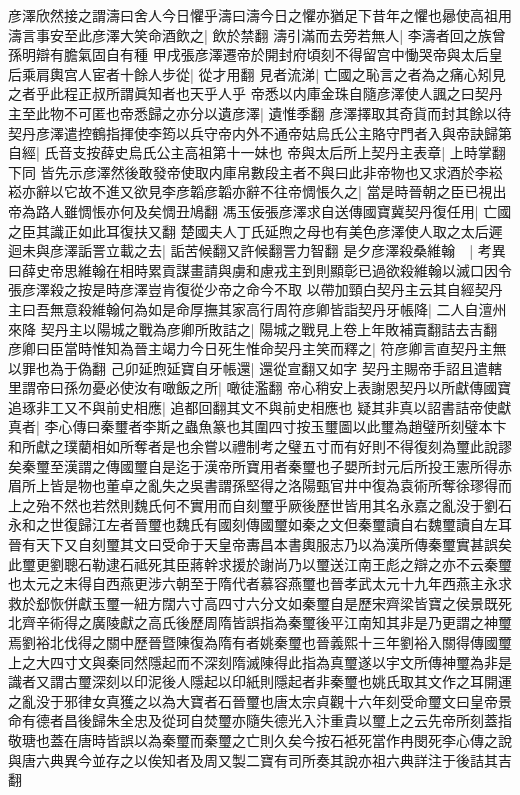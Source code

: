 彦澤欣然接之謂濤曰舍人今日懼乎濤曰濤今日之懼亦猶足下昔年之懼也曏使高祖用濤言事安至此彦澤大笑命酒飲之|{
	飲於禁翻}
濤引滿而去旁若無人|{
	李濤者回之族曾孫明辯有膽氣固自有種}
甲戌張彦澤遷帝於開封府頃刻不得留宫中慟哭帝與太后皇后乘肩輿宫人宦者十餘人步從|{
	從才用翻}
見者流涕|{
	亡國之恥言之者為之痛心矧見之者乎此程正叔所謂眞知者也天乎人乎}
帝悉以内庫金珠自隨彦澤使人諷之曰契丹主至此物不可匿也帝悉歸之亦分以遺彦澤|{
	遺惟季翻}
彦澤擇取其奇貨而封其餘以待契丹彦澤遣控鶴指揮使李筠以兵守帝内外不通帝姑烏氏公主賂守門者入與帝訣歸第自經|{
	氏音支按薛史烏氏公主高祖第十一妹也}
帝與太后所上契丹主表章|{
	上時掌翻下同}
皆先示彦澤然後敢發帝使取内庫帛數段主者不與曰此非帝物也又求酒於李崧崧亦辭以它故不進又欲見李彦韜彦韜亦辭不往帝惆悵久之|{
	當是時晉朝之臣已視出帝為路人雖惆悵亦何及矣惆丑鳩翻}
馮玉佞張彦澤求自送傳國寶冀契丹復任用|{
	亡國之臣其識正如此耳復扶又翻}
楚國夫人丁氏延煦之母也有美色彦澤使人取之太后遲迴未與彦澤詬詈立載之去|{
	詬苦候翻又許候翻詈力智翻}
是夕彦澤殺桑維翰　|{
	考異曰薛史帝思維翰在相時累貢謀畫請與虜和慮戎主到則顯彰已過欲殺維翰以滅口因令張彦澤殺之按是時彦澤豈肯復從少帝之命今不取}
以帶加頸白契丹主云其自經契丹主曰吾無意殺維翰何為如是命厚撫其家高行周符彦卿皆詣契丹牙帳降|{
	二人自澶州來降}
契丹主以陽城之戰為彦卿所敗詰之|{
	陽城之戰見上卷上年敗補賣翻詰去吉翻}
彦卿曰臣當時惟知為晉主竭力今日死生惟命契丹主笑而釋之|{
	符彦卿言直契丹主無以罪也為于偽翻}
己卯延煦延寶自牙帳還|{
	還從宣翻又如字}
契丹主賜帝手詔且遣轄里謂帝曰孫勿憂必使汝有噉飯之所|{
	噉徒濫翻}
帝心稍安上表謝恩契丹以所獻傳國寶追琢非工又不與前史相應|{
	追都回翻其文不與前史相應也}
疑其非真以詔書詰帝使獻真者|{
	李心傳曰秦璽者李斯之蟲魚篆也其圍四寸按玉璽圖以此璽為趙璧所刻璧本卞和所獻之璞藺相如所奪者是也余嘗以禮制考之璧五寸而有好則不得復刻為璽此說謬矣秦璽至漢謂之傳國璽自是迄于漢帝所寶用者秦璽也子嬰所封元后所投王憲所得赤眉所上皆是物也董卓之亂失之吳書謂孫堅得之洛陽甄官井中復為袁術所奪徐璆得而上之殆不然也若然則魏氏何不實用而自刻璽乎厥後歷世皆用其名永嘉之亂没于劉石永和之世復歸江左者晉璽也魏氏有國刻傳國璽如秦之文但秦璽讀自右魏璽讀自左耳晉有天下又自刻璽其文曰受命于天皇帝夀昌本書輿服志乃以為漢所傳秦璽實甚誤矣此璽更劉聰石勒逮石祗死其臣蔣幹求援於謝尚乃以璽送江南王彪之辯之亦不云秦璽也太元之末得自西燕更涉六朝至于隋代者慕容燕璽也晉孝武太元十九年西燕主永求救於郄恢併獻玉璽一紐方闊六寸高四寸六分文如秦璽自是歷宋齊梁皆寶之侯景既死北齊辛術得之廣陵獻之高氏後歷周隋皆誤指為秦璽後平江南知其非是乃更謂之神璽焉劉裕北伐得之關中歷晉暨陳復為隋有者姚秦璽也晉義熙十三年劉裕入關得傳國璽上之大四寸文與秦同然隱起而不深刻隋滅陳得此指為真璽遂以宇文所傳神璽為非是識者又謂古璽深刻以印泥後人隱起以印紙則隱起者非秦璽也姚氏取其文作之耳開運之亂没于邪律女真獲之以為大寶者石晉璽也唐太宗貞觀十六年刻受命璽文曰皇帝景命有德者昌後歸朱全忠及從珂自焚璽亦隨失德光入汴重貴以璽上之云先帝所刻蓋指敬瑭也蓋在唐時皆誤以為秦璽而秦璽之亡則久矣今按石袛死當作冉閔死李心傳之說與唐六典異今並存之以俟知者及周又製二寶有司所奏其說亦祖六典詳注于後詰其吉翻}
